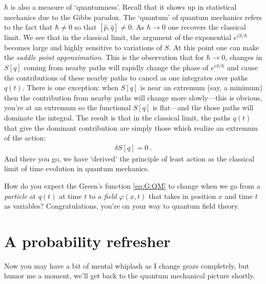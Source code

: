 $\hbar$ is also a measure of `quantumness'. Recall that it shows up in statistical mechanics due to the Gibbs paradox. The `quantum' of quantum mechanics refers to the fact that $\hbar\neq 0$ so that $[\hat p, \hat q] \neq 0$. As $\hbar\to 0$ one recovers the classical limit. We see that in the classical limit, the argument of the exponential $e^{iS/\hbar}$ becomes large and highly sensitive to variations of $S$. At this point one can make the \emph{saddle point approximation}. This is the observation that for $\hbar\to 0$, changes in $S[q]$ coming from nearby paths will rapidly change the phase of $e^{iS/\hbar}$ and cause the contributions of these nearby paths to cancel as one integrates over paths $q(t)$. There is one exception: when $S[q]$ is near an extremum (say, a minimum) then the contribution from nearby paths will change more slowly---this is obvious, you're at an extremum so the functional $S[q]$ is flat---and the those paths will dominate the integral. The result is that in the classical limit, the paths $q(t)$ that give the dominant contribution are simply those which realize an extremum of the action:
\begin{align}
	\delta S[q] = 0 \ .
\end{align}
And there you go, we have `derived' the principle of least action as the classical limit of time evolution in quantum mechanics. 

\begin{exercise}
How do you expect the Green's function \eqref{eq:G:QM} to change when we go from a \emph{particle} at $q(t)$ at time $t$ to a \emph{field} $\varphi(x,t)$ that takes in position $x$ and time $t$ as variables?  Congratulations, you're on your way to quantum field theory. 
\end{exercise}

\section{A probability refresher}

Now you may have a bit of mental whiplash as I change gears completely, but humor me a moment, we'll get back to the quantum mechanical picture shortly. 




